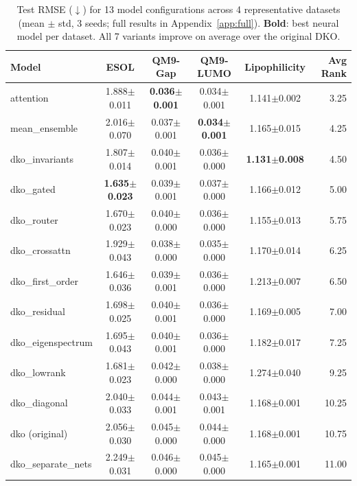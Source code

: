 \documentclass[sigconf]{acmart}
\begin{document}
\begin{table}[!tb]
\caption{Test RMSE ($\downarrow$) for 13 model configurations across 4 representative datasets (mean $\pm$ std, 3 seeds; full results in Appendix~\ref{app:full}). \textbf{Bold}: best neural model per dataset. All 7 variants improve on average over the original DKO.}
\label{tab:main}
\centering
\small
\begin{tabular}{@{}lccccr@{}}
\toprule
Model & ESOL & QM9-Gap & QM9-LUMO & Lipophilicity & Avg Rank \\
\midrule
attention            & 1.888$\pm$0.011 & \textbf{0.036$\pm$0.001} & 0.034$\pm$0.001 & 1.141$\pm$0.002 & 3.25 \\
mean\_ensemble       & 2.016$\pm$0.070 & 0.037$\pm$0.001 & \textbf{0.034$\pm$0.001} & 1.165$\pm$0.015 & 4.25 \\
dko\_invariants      & 1.807$\pm$0.014 & 0.040$\pm$0.001 & 0.036$\pm$0.000 & \textbf{1.131$\pm$0.008} & 4.50 \\
dko\_gated           & \textbf{1.635$\pm$0.023} & 0.039$\pm$0.001 & 0.037$\pm$0.000 & 1.166$\pm$0.012 & 5.00 \\
dko\_router          & 1.670$\pm$0.023 & 0.040$\pm$0.000 & 0.036$\pm$0.000 & 1.155$\pm$0.013 & 5.75 \\
dko\_crossattn       & 1.929$\pm$0.043 & 0.038$\pm$0.000 & 0.035$\pm$0.000 & 1.170$\pm$0.014 & 6.25 \\
dko\_first\_order    & 1.646$\pm$0.036 & 0.039$\pm$0.001 & 0.036$\pm$0.000 & 1.213$\pm$0.007 & 6.50 \\
dko\_residual        & 1.698$\pm$0.025 & 0.040$\pm$0.001 & 0.036$\pm$0.000 & 1.169$\pm$0.005 & 7.00 \\
dko\_eigenspectrum   & 1.695$\pm$0.043 & 0.040$\pm$0.001 & 0.036$\pm$0.000 & 1.182$\pm$0.017 & 7.25 \\
dko\_lowrank         & 1.681$\pm$0.023 & 0.042$\pm$0.000 & 0.038$\pm$0.000 & 1.274$\pm$0.040 & 9.25 \\
dko\_diagonal        & 2.040$\pm$0.033 & 0.044$\pm$0.001 & 0.043$\pm$0.001 & 1.168$\pm$0.001 & 10.25 \\
dko (original)       & 2.056$\pm$0.030 & 0.045$\pm$0.000 & 0.044$\pm$0.000 & 1.168$\pm$0.001 & 10.75 \\
dko\_separate\_nets  & 2.249$\pm$0.031 & 0.046$\pm$0.000 & 0.045$\pm$0.000 & 1.165$\pm$0.001 & 11.00 \\
\bottomrule
\end{tabular}
\end{table}
\end{document}

